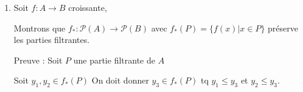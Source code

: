 \documentclass[12pt]{article}
\begin{document}
\begin{enumerate}
\begin{enumerate}
\item $(X, Id_X)$

    Soit $P$ une partie filtrante de $(X,Id_X)$ . C'est nécessairement un singleton $\{x_0\}$. 

    $P$ est non vide, et si 

    \begin{align*}
        \forall x, y \in P, \text{ on a } z \in P, \\ 
        \text{tel que } x \leq z \text{ et } y \leq z\\ 
        \text{Donc } x = y = z 
    \end{align*}

\textbf{Remarque} : Soit $X$ un ensemble et $A$ une ensemble ordonné, On a :
\[ \textbf{Set}(X, A.Sup) \cong \textbf{Pos}(Disc(X), A)\]


\item Soit $P$ une partie filtrante de $\mathbb{N}_{\bot}$, Une telle partie peut être :
\begin{itemize}
    \item $P = \{\bot\}$, alors $\bigvee P = \bot$
    \item $P = \{n\}$, alors $\bigvee P = n$
    \item $P = \{\bot, n\}$, alors $\bigvee P = n$
\end{itemize} 

\item $(X^\infty, \leq)$  où $X$ est un ensemble quelconque.
    Soit $P$ une partie filtrante de $X^\infty$. 

    \begin{itemize}
        \item Si $P$ est finie, alors $\bigvee P = $ le plus grand élément de $P$.
        \item SI $P$ est infini : $P$ prend le forme d'une suite de préfixe de longueur strictement croissante d'une unique suite infinie qui est son supremum.
    \end{itemize}
\end{enumerate}

\item Soit $f : A \rightarrow B$ croissante,

    Montrons que $f_* : \mathcal{P}(A) \rightarrow \mathcal{P}(B) $ avec $f_*(P) = \{ f(x) | x \in P\}$ préserve les parties filtrantes.

    Preuve : Soit $P$ une partie filtrante de $A$  

    Soit $y_1,y_2 \in f_*(P)$ On doit donner $y_3 \in f_*(P)$ tq $y_1 \leq y_3$ et $y_2 \leq y_3$. 


\end{enumerate}
\end{document}
